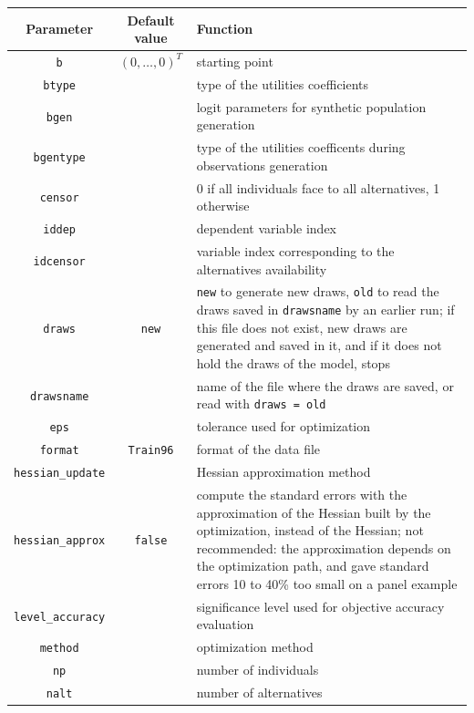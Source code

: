 \begin{table}[htbp]
\begin{small}
\begin{center}
\begin{tabular}{|c|c|p{6cm}|}
\hline
{\bf Parameter} & {\bf Default value} & {\bf Function} \\
\hline
\verb|b| & $(0,\ldots,0)^T$ & starting point \\
\hline
\verb|btype| & & type of the utilities coefficients \\
\hline
\verb|bgen| & & logit parameters for synthetic population generation \\
\hline
\verb|bgentype| & & type of the utilities coefficents during observations
generation\\
\hline
\verb|censor| & & 0 if all individuals face to all alternatives, 1
otherwise \\
\hline
\verb|iddep| & & dependent variable index\\
\hline
\verb|idcensor| & & variable index corresponding to the alternatives
availability \\
\hline
\verb|draws| & \verb|new| & \verb|new| to generate new draws, \verb|old|
to read the draws saved in \verb|drawsname| by an earlier run; if this
file does not exist, new draws are generated and saved in it, and if it
does not hold the draws of the model, \amlet{} stops\\
\hline
\verb|drawsname| & & name of the file where the draws are saved, or
read with \verb|draws = old|\\
\hline
\verb|eps| & & tolerance used for optimization \\
\hline
\verb|format| & \verb|Train96| & format of the data file \\
\hline
\verb|hessian_update| & & Hessian approximation method \\
\hline
\verb|hessian_approx| & \verb|false| & compute the standard errors with
the approximation of the Hessian built by the optimization, instead of
the Hessian; not recommended: the approximation depends on the
optimization path, and gave standard errors 10 to 40\% too small on a
panel example \\
\hline
\verb|level_accuracy| & & significance level used for objective accuracy
evaluation \\
\hline
\verb|method| & & optimization method \\
\hline
\verb|np| & & number of individuals \\
\hline
\verb|nalt| & & number of alternatives \\

\end{tabular}
\end{center}
\end{small}
\end{table}
